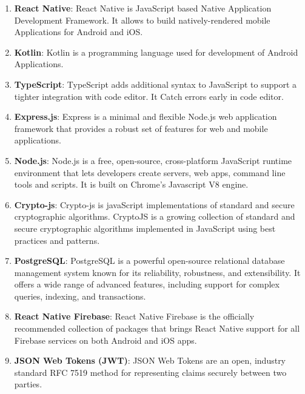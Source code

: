 \begin{enumerate}[label=\roman*.]
  \item \textbf{React Native}: React Native is JavaScript based Native Application Development Framework. It allows to build natively-rendered mobile Applications for Android and iOS. \cite{RN}
  
  \item \textbf{Kotlin}: Kotlin is a programming language used for development of Android Applications. \cite{kt}
  
  \item \textbf{TypeScript}: TypeScript adds additional syntax to JavaScript to support a tighter integration with code editor. It Catch errors early in code editor. \cite{TypeScript}
  
  \item \textbf{Express.js}: Express is a minimal and flexible Node.js web application framework that provides a robust set of features for web and mobile applications. \cite{Express}
  
  \item \textbf{Node.js}: Node.js is a free, open-source, cross-platform JavaScript runtime environment that lets developers create servers, web apps, command line tools and scripts. It is built on Chrome's Javascript V8 engine. \cite{Node}
  
  \item \textbf{Crypto-js}: Crypto-js is javaScript implementations of standard and secure cryptographic algorithms. CryptoJS is a growing collection of standard and secure cryptographic algorithms implemented in JavaScript using best practices and patterns. \cite{Crypto-js}

  \item \textbf{PostgreSQL}: PostgreSQL is a powerful open-source relational database management system known for its reliability, robustness, and extensibility. It offers a wide range of advanced features, including support for complex queries, indexing, and transactions. \cite{psql}
 
  \item \textbf{React Native Firebase}: React Native Firebase is the officially recommended collection of packages that brings React Native support for all Firebase services on both Android and iOS apps. \cite{RNF}
  
  \item \textbf{JSON Web Tokens (JWT)}: JSON Web Tokens are an open, industry standard RFC 7519 method for representing claims securely between two parties. \cite{JWT}
  

\end{enumerate}

